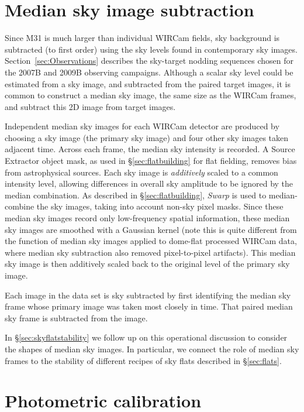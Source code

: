 \documentclass[iop]{emulateapj}
\newcommand{\sw}[1]{\textit{#1}} %
\newcommand{\Sec}[1]{\S\ref{sec:#1}}  %
\begin{document}
\section{Median sky image subtraction}
\label{sec:mediansky}

Since M31 is much larger than individual WIRCam fields, sky background is subtracted (to first order) using the sky levels found in contemporary sky images.
Section~\ref{sec:Observations} describes the sky-target nodding sequences chosen for the 2007B and 2009B observing campaigns. 
Although a scalar sky level could be estimated from a sky image, and subtracted from the paired target images, it is common to construct a median sky image, the same size as the WIRCam frames, and subtract this 2D image from target images.

Independent median sky images for each WIRCam detector are produced by choosing a sky image (the primary sky image) and four other sky images taken adjacent time.
Across each frame, the median sky intensity is recorded.
A Source Extractor object mask, as used in \Sec{flatbuilding} for flat fielding, removes bias from astrophysical sources.
Each sky image is \emph{additively} scaled to a common intensity level, allowing differences in overall sky amplitude to be ignored by the median combination.
As described in \Sec{flatbuilding}, \sw{Swarp} is used to median-combine the sky images, taking into account non-sky pixel masks.
Since these median sky images record only low-frequency spatial information, these median sky images are smoothed with a Gaussian kernel (note this is quite different from the function of median sky images applied to dome-flat processed WIRCam data, where median sky subtraction also removed pixel-to-pixel artifacts).
This median sky image is then additively scaled back to the original level of the primary sky image.

Each image in the data set is sky subtracted by first identifying the median sky frame whose primary image was taken most closely in time.
That paired median sky frame is subtracted from the image.

In \Sec{skyflatstability} we follow up on this operational discussion to consider the shapes of median sky images. In particular, we connect the role of median sky frames to the stability of different recipes of sky flats described in \Sec{flats}.

\section{Photometric calibration}
\label{sec:photocal}
\end{document}
